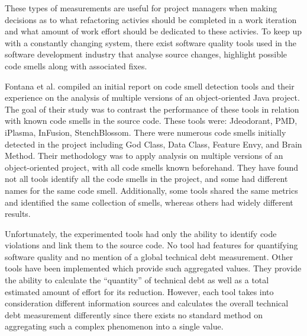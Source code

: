 \documentclass{mprop}
\begin{document}

These types of measurements are useful for project managers when making
decisions as to what refactoring activies should be completed in a work
iteration and what amount of work effort should be dedicated to these activies.
To keep up with a constantly changing system, there exist software quality tools
used in the software development industry that analyse source changes, highlight
possible code smells along with associated fixes.

Fontana et al. \cite{Fontana2011} compiled an initial report on code smell
detection tools and their experience on the analysis of multiple versions of an
object-oriented Java project. The goal of their study was to contrast the
performance of these tools in relation with known code smells in the source
code. These tools were: Jdeodorant, PMD, iPlasma, InFusion, StenchBlossom. There
were numerous code smells initially detected in the project including God Class,
Data Class, Feature Envy, and Brain Method. Their methodology was to apply
analysis on multiple versions of an object-oriented project, with all code
smells known beforehand. They have found not all tools identify all the code
smells in the project, and some had different names for the same code smell.
Additionally, some tools shared the same metrics and identified the same
collection of smells, whereas others had widely different results.

Unfortunately, the experimented tools had only the ability to identify code
violations and link them to the source code. No tool had features for
quantifying software quality and no mention of a global technical debt
measurement. Other tools have been implemented which provide such aggregated
values. They provide the ability to calculate the ``quantity'' of technical debt
as well as a total estimated amount of effort for its reduction. However, each
tool takes into consideration different information sources and calculates the
overall technical debt measurement differently since there exists no standard
method on aggregating such a complex phenomenon into a single value.
\end{document}
